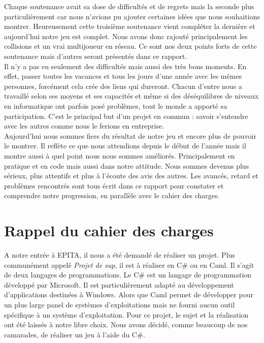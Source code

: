 \documentclass[12pt]{article}
\begin{document}
Chaque soutenance avait sa dose de difficultés et de regrets mais la seconde plus particulièrement car nous n’avions pu ajouter certaines idées que nous souhaitions montrer. Heureusement cette troisième soutenance vient compléter la dernière et aujourd’hui notre jeu est complet. Nous avons donc rajouté principalement les collisions et un vrai multijoueur en réseau. Ce sont nos deux points forts de cette soutenance mais d’autres seront présentés dans ce rapport.\\

Il n’y a pas eu seulement des difficultés mais aussi des très bons moments. En effet, passer toutes les vacances et tous les jours  d’une année avec les mêmes personnes, forcément cela crée des liens qui dureront. Chacun d’entre nous a travaillé selon ses moyens et ses capacités et même si des déséquilibres de niveaux en informatique ont parfois posé problèmes, tout le monde a apporté sa participation. C’est le principal but d’un projet en commun : savoir s’entendre avec les autres comme nous le ferions en entreprise.\\

Aujourd’hui nous sommes fiers du résultat  de notre jeu et encore plus de pouvoir le montrer. Il reflète ce que nous attendions depuis le début de l’année mais il montre aussi à quel point nous nous sommes améliorés. Principalement en pratique et en code mais aussi dans notre attitude. Nous sommes devenus plus sérieux, plus attentifs et plus à l'écoute des avis des autres. Les avancés, retard et problèmes rencontrés sont tous écrit dans ce rapport pour constater et comprendre notre progression, en parallèle avec le cahier des charges.\\


\newpage

\section{Rappel du cahier des charges}

A notre entrée à EPITA, il nous a été demandé de réaliser un projet. Plus communément appelé \textit{Projet de sup}, il est à réaliser en C\# ou en Caml. Il s'agit de deux langages de programmations. Le C\# est un langage de programmation développé par Microsoft. Il est particulièrement adapté au développement d'applications destinées à Windows. Alors que Caml permet de développer pour un plus large panel de systèmes d'exploitations mais ne fourni aucun outil spécifique à un système d'exploitation. Pour ce projet, le sujet et la réalisation ont été laissés à notre libre choix. Nous avons décidé, comme beaucoup de nos camarades, de réaliser un jeu à l'aide du C\#.
\end{document}
